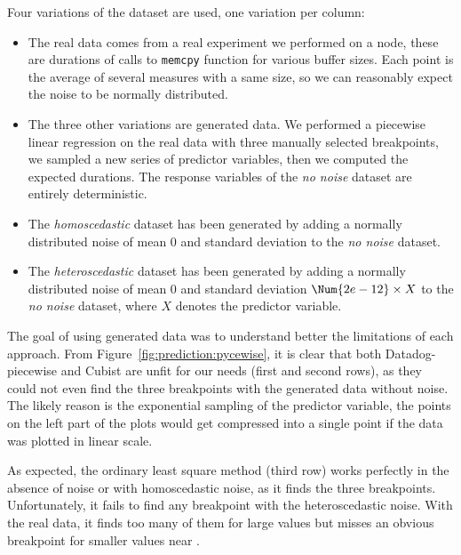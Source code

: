                Four variations of the dataset are used, one variation per column:
                \begin{itemize}
                    \item The real data comes from a real experiment we performed on a node, these are durations of
                        calls to \texttt{memcpy} function for various buffer sizes. Each point is the average of several
                        measures with a same size, so we can reasonably expect the noise to be normally distributed.
                    \item The three other variations are generated data. We performed a piecewise linear regression on
                        the real data with three manually selected breakpoints, we sampled a new series of predictor
                        variables, then we computed the expected durations. The response variables of the \emph{no
                        noise} dataset are entirely deterministic.
                    \item The \emph{homoscedastic} dataset has been generated by adding a normally distributed noise of
                        mean 0 and standard deviation  to the \emph{no noise} dataset.
                    \item The \emph{heteroscedastic} dataset has been generated by adding a normally distributed noise
                        of mean 0 and standard deviation \(\Num{2e-12}\times X\) to the \emph{no noise} dataset, where
                        \(X\) denotes the predictor variable.
                \end{itemize}

                The goal of using generated data was to understand better the limitations of each approach. From
                Figure~\ref{fig:prediction:pycewise}, it is clear that both Datadog-piecewise and Cubist are unfit for
                our needs (first and second rows), as they could not even find the three breakpoints with the generated
                data without noise. The likely reason is the exponential sampling of the predictor variable, the points
                on the left part of the plots would get compressed into a single point if the data was plotted in linear
                scale.

                As expected, the ordinary least square method (third row) works perfectly in the absence of noise or
                with homoscedastic noise, as it finds the three breakpoints. Unfortunately, it fails to find any
                breakpoint with the heteroscedastic noise. With the real data, it finds too many of them for large
                values but misses an obvious breakpoint for smaller values near .

